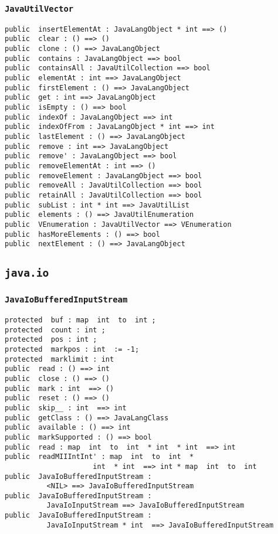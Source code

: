 \documentclass[\pformat,12pt]{article}
\begin{document}
\subsubsection{\texttt{JavaUtilVector}}
\begin{small}
\begin{verbatim}
public  insertElementAt : JavaLangObject * int ==> ()
public  clear : () ==> ()
public  clone : () ==> JavaLangObject
public  contains : JavaLangObject ==> bool
public  containsAll : JavaUtilCollection ==> bool
public  elementAt : int ==> JavaLangObject
public  firstElement : () ==> JavaLangObject
public  get : int ==> JavaLangObject
public  isEmpty : () ==> bool
public  indexOf : JavaLangObject ==> int
public  indexOfFrom : JavaLangObject * int ==> int
public  lastElement : () ==> JavaLangObject
public  remove : int ==> JavaLangObject
public  remove' : JavaLangObject ==> bool
public  removeElementAt : int ==> ()
public  removeElement : JavaLangObject ==> bool
public  removeAll : JavaUtilCollection ==> bool
public  retainAll : JavaUtilCollection ==> bool
public  subList : int * int ==> JavaUtilList
public  elements : () ==> JavaUtilEnumeration
public  VEnumeration : JavaUtilVector ==> VEnumeration
public  hasMoreElements : () ==> bool
public  nextElement : () ==> JavaLangObject
\end{verbatim}
\end{small}

\subsection{\texttt{java.io}}

\subsubsection{\texttt{JavaIoBufferedInputStream}}
\begin{small}
\begin{verbatim}
protected  buf : map  int  to  int ;
protected  count : int ;
protected  pos : int ;
protected  markpos : int  := -1;
protected  marklimit : int
public  read : () ==> int
public  close : () ==> ()
public  mark : int  ==> ()
public  reset : () ==> ()
public  skip__ : int  ==> int
public  getClass : () ==> JavaLangClass
public  available : () ==> int
public  markSupported : () ==> bool
public  read : map  int  to  int  * int  * int  ==> int
public  readMIIIntInt' : map  int  to  int  * 
                     int  * int  ==> int * map  int  to  int
public  JavaIoBufferedInputStream : 
          <NIL> ==> JavaIoBufferedInputStream
public  JavaIoBufferedInputStream : 
          JavaIoInputStream ==> JavaIoBufferedInputStream
public  JavaIoBufferedInputStream : 
          JavaIoInputStream * int  ==> JavaIoBufferedInputStream
\end{verbatim}
\end{small}
\end{document}

